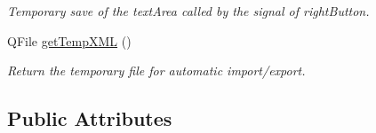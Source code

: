 \begin{DoxyCompactItemize}
\begin{DoxyCompactList}\small\item\em Temporary save of the text\+Area called by the signal of right\+Button. \end{DoxyCompactList}\item 
\hypertarget{classArea_aa1091e597fb4957f7fa930e79f286205}{Q\+File \hyperlink{classArea_aa1091e597fb4957f7fa930e79f286205}{get\+Temp\+X\+M\+L} ()}\label{classArea_aa1091e597fb4957f7fa930e79f286205}

\begin{DoxyCompactList}\small\item\em Return the temporary file for automatic import/export. \end{DoxyCompactList}\end{DoxyCompactItemize}
\subsection*{Public Attributes}
